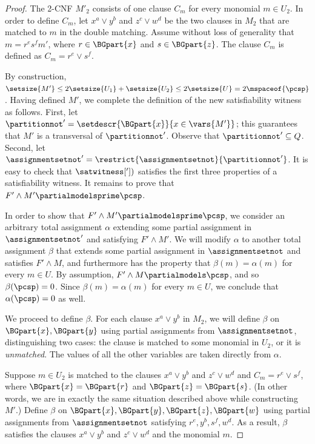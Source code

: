 \documentclass[11pt]{article}
\numberwithin{equation}{section}
\theoremstyle{definition}
\theoremstyle{plain}
\begin{document}
\begin{proof}
The 2-CNF $M'_2$ consists of one clause $C_m$ for every monomial $m \in U_2$. In order to define $C_m$, let $x^a \lor y^b$ and $z^c \lor w^d$ be the two clauses in $M_2$ that are matched to $m$ in the double matching. Assume without loss of generality that $m = r^e s^f m'$, where $r \in \BGpart{x}$ and $s \in \BGpart{z}$. The clause $C_m$ is defined as $C_m = r^e \lor s^f$.

By construction, $\setsize{M'} \leq 2\setsize{U_1} + \setsize{U_2} \leq 2\setsize{U} = 2\mspaceof{\pcsp}$. Having defined $M'$, we complete the definition of the new satisfiability witness as follows. First, let $\partitionnot' = \setdescr{\BGpart{x}}{x\in\vars{M'}}$; this guarantees that $M'$ is a transversal of $\partitionnot'$. Observe that $\partitionnot'\subseteq{Q}$. Second, let $\assignmentsetnot'=\restrict{\assignmentsetnot}{\partitionnot'}$. It is easy to check that $\satwitness['])$ satisfies the first three properties of a satisfiability witness. It remains to prove that $F' \land M' \partialmodelsprime \pcsp$.

In order to show that $F'\land M' \partialmodelsprime \pcsp$, we consider an arbitrary total assignment $\alpha$ extending some partial assignment in $\assignmentsetnot'$ and satisfying $F' \land M'$. We will modify $\alpha$ to another total assignment $\beta$ that extends some partial assignment in $\assignmentsetnot$ and satisfies $F' \land M$, and furthermore has the property that $\beta(m) = \alpha(m)$ for every $m \in U$. By assumption, $F' \land M \partialmodels \pcsp$, and so $\beta(\pcsp) = 0$. Since $\beta(m) = \alpha(m)$ for every $m \in U$, we conclude that $\alpha(\pcsp) = 0$ as well.

We proceed to define $\beta$. For each clause $x^a \lor y^b$ in $M_2$, we will define $\beta$ on $\BGpart{x},\BGpart{y}$ using partial assignments from $\assignmentsetnot$, distinguishing two cases: the clause is matched to some monomial in $U_2$, or it is \emph{unmatched}. The values of all the other variables are taken directly from $\alpha$.

Suppose $m \in U_2$ is matched to the clauses $x^a \lor y^b$ and $z^c \lor w^d$ and $C_m = r^e \lor s^f$, where $\BGpart{x} = \BGpart{r}$ and $\BGpart{z} = \BGpart{s}$. (In other words, we are in exactly the same situation described above while constructing $M'$.) Define $\beta$ on $\BGpart{x},\BGpart{y},\BGpart{z},\BGpart{w}$ using partial assignments from $\assignmentsetnot$ satisfying $r^e,y^b,s^f,w^d$. As a result, $\beta$ satisfies the clauses $x^a \lor y^b$ and $z^c \lor w^d$ and the monomial $m$.


\end{proof}
\end{document}
